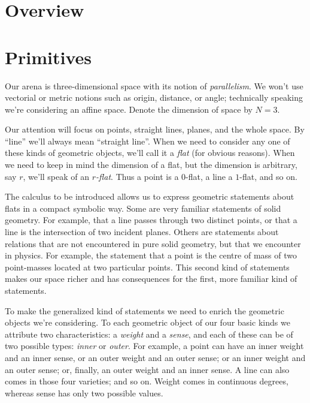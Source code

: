 \documentclass[\ifafour a4paper,12pt,\else a5paper,10pt,\fi%
onecolumn,oneside,article,%
british%
]{memoir}
\theoremstyle{remark}
\theoremstyle{innote}
\renewcommand*{\|}{\nonscript\,\vert\nonscript\;\mathopen{}}
\newcommand*{\+}{\boxplus}
\newcommand*{\yN}{N}
\begin{document}
\section{Overview}
\label{sec:overview}



\section{Primitives}
\label{sec:primitives}

Our arena is three-dimensional space with its notion of \emph{parallelism}.
We won't use vectorial or metric notions such as origin, distance, or
angle; technically speaking we're considering an affine space. Denote the
dimension of space by $\yN=3$.

Our attention will focus on points, straight lines, planes, and the whole
space. By \enquote{line} we'll always mean \enquote{straight line}. When we
need to consider any one of these kinds of geometric objects, we'll call it
a \emph{flat} (for obvious reasons). When we need to keep in mind the
dimension of a flat, but the dimension is arbitrary, say $r$, we'll speak
of an \emph{$r$-flat}. Thus a point is a $0$-flat, a line a $1$-flat, and
so on.

The calculus to be introduced allows us to express geometric statements
about flats in a compact symbolic way. Some are very familiar statements of
solid geometry. For example, that a line passes through two distinct
points, or that a line is the intersection of two incident planes. Others are
statements  about relations that are not encountered in pure solid
geometry, but that we encounter in physics. For example, the statement that
a point is the centre of mass of two point-masses located at two particular
points. This second kind of statements makes our space  richer and has
consequences for the first, more familiar kind of statements.

To make the generalized kind of statements we need to enrich the geometric
objects we're considering. To each geometric object of our four basic kinds
we attribute two characteristics: a \emph{weight} and a \emph{sense}, and
each of these can be of two possible types: \emph{inner} or \emph{outer}.
For example, a point can have an inner weight and an inner sense, or
an outer weight and an outer sense; or an inner weight and an outer
sense; or, finally, an outer weight and an inner sense. A line
can also comes in those four varieties; and so on. Weight comes in
continuous degrees, whereas sense has only two possible values.
\end{document}
